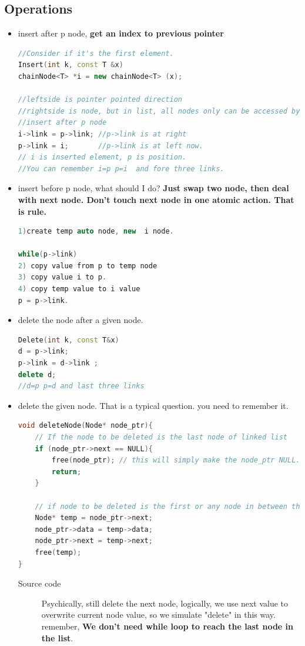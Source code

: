 \documentclass[a4paper,11pt,twoside]{book}
\begin{document}
\subsection{Operations}
\begin{itemize}
\item insert after p node, \textbf{get an index to previous pointer}
\begin{lstlisting}[frame=single, language=c++, mathescape=true]
//Consider if it's the first element. 
Insert(int k, const T &x)
chainNode<T> *i = new chainNode<T> (x);

//leftside is pointer pointed direction
//rightside is node, but in list, all nodes only can be accessed by a pointer.
//insert after p node 
i->link = p->link; //p->link is at right
p->link = i;       //p->link is at left now.
// i is inserted element, p is position.  
//You can remember i=p p=i  and fore three links.
\end{lstlisting}

\item insert before p node, what should I do?  \textbf{Just swap two node, then deal with next node. Don't touch next node in one atomic action. That is rule. }
\begin{lstlisting}[frame=single, language=c++, mathescape=true]
1)create temp auto node, new  i node.
 
while(p->link) 
2) copy value from p to temp node
3) copy value i to p.
4) copy temp value to i value
p = p->link.  
\end{lstlisting}

\item delete the node after a given node.
\begin{lstlisting}[frame=single, language=c++]
Delete(int k, const T&x)
d = p->link;
p->link = d->link ;
delete d;
//d=p p=d and last three links
\end{lstlisting}

\item delete the given node. That is a typical question. you need to remember it. 
\begin{lstlisting}[frame=single, language=c++]
void deleteNode(Node* node_ptr){
	// If the node to be deleted is the last node of linked list
	if (node_ptr->next == NULL){
		free(node_ptr); // this will simply make the node_ptr NULL.
		return;
	}
	
	// if node to be deleted is the first or any node in between the linked list.
	Node* temp = node_ptr->next;
	node_ptr->data = temp->data;
	node_ptr->next = temp->next;
	free(temp);
}
\end{lstlisting}
\begin{description}
	\item[Source code] Psychically, still delete the next node, logically, we use next value to overwrite current node value, so we simulate "delete" in this way. remember, \textbf{We don't need while loop to reach the last node in the list}. 
\end{description}


\end{itemize}
\end{document}
